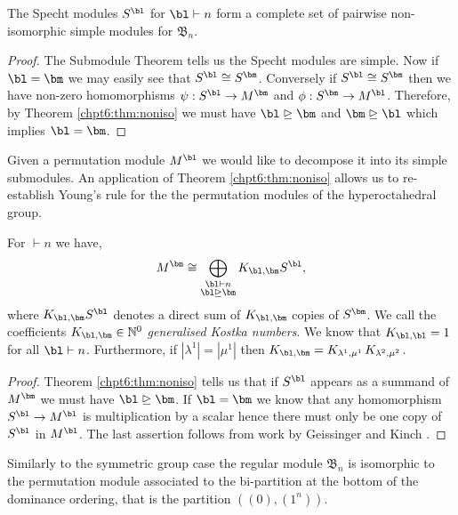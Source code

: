 \documentclass[11pt]{report}
\begin{document}
\begin{corollary}
	\label{chpt6:cor:simp}
	The Specht modules $S^{\bl}$ for $\bl \vdash n$ form a complete set of pairwise non-isomorphic simple modules for $\mathfrak{B}_{n}$.
\end{corollary}
\begin{proof}
	The Submodule Theorem tells us the Specht modules are simple. Now if $\bl = \bm$ we may easily see that $S^{\bl} \cong S^{\bm}$. Conversely if $S^{\bl} \cong S^{\bm}$ then we have non-zero homomorphisms $\psi:S^{\bl} \to M^{\bm}$ and $\phi:S^{\bm} \to M^{\bl}$. Therefore, by Theorem \ref{chpt6:thm:noniso} we must have $\bl \trianglerighteq \bm$ and $\bm \trianglerighteq \bl$ which implies $\bl = \bm$.
\end{proof}


Given a permutation module $M^{\bl}$ we would like to decompose it into its simple submodules. An application of Theorem \ref{chpt6:thm:noniso} allows us to re-establish Young's rule for the the permutation modules of the hyperoctahedral group. 	


\begin{lemma}
	\label{chpt6:lem:youngsrule}
	For $\bm \vdash n$ we have,
	\begin{eqnarray}
	M^{\bm} \cong \bigoplus_{\substack{\bl \vdash n \\ \bl \trianglerighteq \bm }}K_{\bl,\bm} S^{\bl},
	\end{eqnarray}
	where $K_{\bl,\bm} S^{\bl}$ denotes a direct sum of $K_{\bl,\bm}$ copies of $S^{\bm}$. We call the coefficients $K_{\bl,\bm} \in \mathbb{N}^{0}$ \emph{generalised Kostka numbers}. We know that $K_{\bl,\bl} =1$ for all $\bl \vdash n$. Furthermore, if $|\lambda^{1}| = |\mu^{1}|$ then $K_{\bl,\bm} = K_{\lambda^{1},\mu^{1}} \, K_{\lambda^{2},\mu^{2}}$.  
\end{lemma}
\begin{proof}
	Theorem \ref{chpt6:thm:noniso} tells us that if $S^{\bl}$ appears as a summand of $M^{\bm}$ we must have $\bl \trianglerighteq \bm$. If $\bl=\bm$ we know that any homomorphism $S^{\bl} \to M^{\bl}$ is multiplication by a scalar hence there must only be one copy of $S^{\bl}$ in $M^{\bl}$. The last assertion follows from work by Geissinger and Kinch \cite[Corollary II.3]{geissinger1978representations}.
\end{proof}

Similarly to the symmetric group case the regular module $\mathfrak{B}_{n}$ is isomorphic to the permutation module associated to the bi-partition at the bottom of the dominance ordering, that is the partition $((0),(1^{n}))$.
\end{document}
